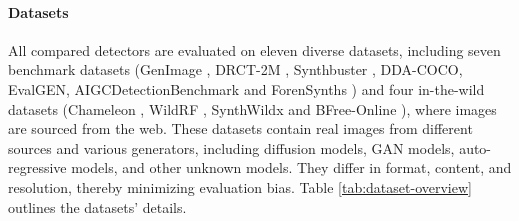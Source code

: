 \documentclass{article}
\begin{document}
\paragraph{Datasets} All compared detectors are evaluated on eleven diverse datasets, including seven benchmark datasets (GenImage \cite{zhu2023genimage}, DRCT-2M \cite{chen2024drct}, Synthbuster \cite{bammey2023synthbuster}, DDA-COCO, EvalGEN, AIGCDetectionBenchmark \cite{zhong2024patchcraft} and ForenSynths \cite{wang2020cnn2} ) and four in-the-wild datasets (Chameleon \cite{yan2024sanity}, WildRF \cite{cavia2024real}, SynthWildx \cite{cozzolino2024raising} and BFree-Online \cite{guillaro2024bias}), where images are sourced from the web. These datasets contain real images from different sources and various generators, including diffusion models, GAN models, auto-regressive models, and other unknown models. They differ in format, content, and resolution, thereby minimizing evaluation bias. Table \ref{tab:dataset-overview} outlines the datasets' details.
\end{document}
